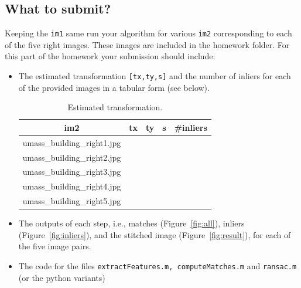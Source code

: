 \documentclass[10pt,letterpaper]{article}
\newcommand{\cmd}[1] {{\color{blue}\texttt{#1}}}
\begin{document}
\subsection{What to submit?}
Keeping the \cmd{im1} same run your algorithm for various \cmd{im2} corresponding to each of the five right images. These images are included in the homework folder.
For this part of the homework your submission should include:
\begin{itemize}

\item The estimated transformation \cmd{[tx,ty,s]} and the number of inliers for each of the provided images in a tabular form (see below).

\begin{table}[h]
\centering
\begin{tabular}{c|c|c|c|c}
im2 & tx & ty & s & \#inliers\\
\hline
umass\_building\_right1.jpg & & & &\\
umass\_building\_right2.jpg & & & &\\
umass\_building\_right3.jpg & & & &\\
umass\_building\_right4.jpg & & & &\\
umass\_building\_right5.jpg & & & &\\
\end{tabular}
\caption{Estimated transformation.}
\end{table}
\item The outputs of each step, i.e., matches (Figure~\ref{fig:all}), inliers (Figure~\ref{fig:inliers}), and the stitched image (Figure~\ref{fig:result}), for each of the five image pairs.
\item The code for the files \cmd{extractFeatures.m, computeMatches.m} and \cmd{ransac.m} (or the python variants)
\end{itemize}
\end{document}
